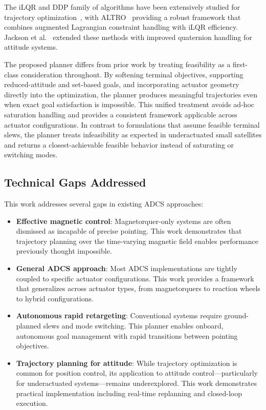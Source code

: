 \documentclass[conference]{IEEEtran}
\begin{document}
The iLQR and DDP family of algorithms have been extensively studied for trajectory optimization~\cite{tassa2012synthesis,todorov2005generalized}, with ALTRO~\cite{howell_altro_2019} providing a robust framework that combines augmented Lagrangian constraint handling with iLQR efficiency. Jackson et al.~\cite{jackson_planning_2021} extended these methods with improved quaternion handling for attitude systems.

The proposed planner differs from prior work by treating feasibility as a first-class consideration throughout. By softening terminal objectives, supporting reduced-attitude and set-based goals, and incorporating actuator geometry directly into the optimization, the planner produces meaningful trajectories even when exact goal satisfaction is impossible. This unified treatment avoids ad-hoc saturation handling and provides a consistent framework applicable across actuator configurations. In contrast to formulations that assume feasible terminal slews, the planner treats infeasibility as expected in underactuated small satellites and returns a closest-achievable feasible behavior instead of saturating or switching modes.

\subsection{Technical Gaps Addressed}\label{subsec:technical_gaps}

This work addresses several gaps in existing ADCS approaches:

\begin{itemize}
    \item \textbf{Effective magnetic control}: Magnetorquer-only systems are often dismissed as incapable of precise pointing. This work demonstrates that trajectory planning over the time-varying magnetic field enables performance previously thought impossible.

    \item \textbf{General ADCS approach}: Most ADCS implementations are tightly coupled to specific actuator configurations. This work provides a framework that generalizes across actuator types, from magnetorquers to reaction wheels to hybrid configurations.

    \item \textbf{Autonomous rapid retargeting}: Conventional systems require ground-planned slews and mode switching. This planner enables onboard, autonomous goal management with rapid transitions between pointing objectives.

    \item \textbf{Trajectory planning for attitude}: While trajectory optimization is common for position control, its application to attitude control---particularly for underactuated systems---remains underexplored. This work demonstrates practical implementation including real-time replanning and closed-loop execution.
\end{itemize}
\end{document}
